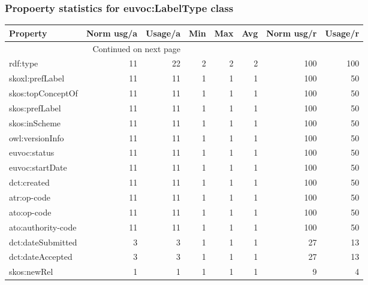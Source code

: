 \documentclass[10pt,a4paper,titlepage,final]{article}
\begin{document}
\subsubsection{Propoerty statistics for euvoc:LabelType class}
\begin{longtable}{lrrrrrrr}
\toprule
           Property &  Norm usg/a &  Usage/a &  Min &  Max &  Avg &  Norm usg/r &  Usage/r \\
\midrule
\endhead
\midrule
\multicolumn{3}{r}{{Continued on next page}} \\
\midrule
\endfoot

\bottomrule
\endlastfoot
           rdf:type &          11 &       22 &    2 &    2 &    2 &         100 &      100 \\
    skoxl:prefLabel &          11 &       11 &    1 &    1 &    1 &         100 &       50 \\
  skos:topConceptOf &          11 &       11 &    1 &    1 &    1 &         100 &       50 \\
     skos:prefLabel &          11 &       11 &    1 &    1 &    1 &         100 &       50 \\
      skos:inScheme &          11 &       11 &    1 &    1 &    1 &         100 &       50 \\
    owl:versionInfo &          11 &       11 &    1 &    1 &    1 &         100 &       50 \\
       euvoc:status &          11 &       11 &    1 &    1 &    1 &         100 &       50 \\
    euvoc:startDate &          11 &       11 &    1 &    1 &    1 &         100 &       50 \\
        dct:created &          11 &       11 &    1 &    1 &    1 &         100 &       50 \\
        atr:op-code &          11 &       11 &    1 &    1 &    1 &         100 &       50 \\
        ato:op-code &          11 &       11 &    1 &    1 &    1 &         100 &       50 \\
 ato:authority-code &          11 &       11 &    1 &    1 &    1 &         100 &       50 \\
  dct:dateSubmitted &           3 &        3 &    1 &    1 &    1 &          27 &       13 \\
   dct:dateAccepted &           3 &        3 &    1 &    1 &    1 &          27 &       13 \\
        skos:newRel &           1 &        1 &    1 &    1 &    1 &           9 &        4 \\
\end{longtable}
\end{document}
